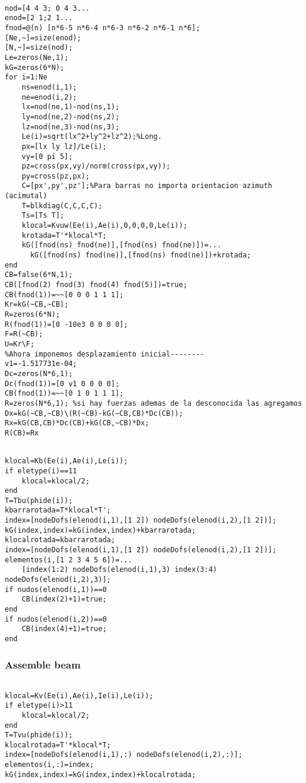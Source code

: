\begin{code}
\begin{verbatim}

nod=[4 4 3; 0 4 3...
enod=[2 1;2 1...
fnod=@(n) [n*6-5 n*6-4 n*6-3 n*6-2 n*6-1 n*6];
[Ne,~]=size(enod);
[N,~]=size(nod);
Le=zeros(Ne,1);
kG=zeros(6*N);
for i=1:Ne
    ns=enod(i,1);
    ne=enod(i,2);
    lx=nod(ne,1)-nod(ns,1);
    ly=nod(ne,2)-nod(ns,2);
    lz=nod(ne,3)-nod(ns,3);
    Le(i)=sqrt(lx^2+ly^2+lz^2);%Long.
    px=[lx ly lz]/Le(i);
    vy=[0 pi 5];
    pz=cross(px,vy)/norm(cross(px,vy));
    py=cross(pz,px);
    C=[px',py',pz'];%Para barras no importa orientacion azimuth (acimutal)
    T=blkdiag(C,C,C,C);
    Ts=[Ts T];
    klocal=Kvuw(Ee(i),Ae(i),0,0,0,0,Le(i));
    krotada=T'*klocal*T;
    kG([fnod(ns) fnod(ne)],[fnod(ns) fnod(ne)])=...
      kG([fnod(ns) fnod(ne)],[fnod(ns) fnod(ne)])+krotada;
end
CB=false(6*N,1);
CB([fnod(2) fnod(3) fnod(4) fnod(5)])=true;
CB(fnod(1))=~~[0 0 0 1 1 1];
Kr=kG(~CB,~CB);
R=zeros(6*N);
R(fnod(1))=[0 -10e3 0 0 0 0];
F=R(~CB);
U=Kr\F;
%Ahora imponemos desplazamiento inicial--------
v1=-1.517731e-04;
Dc=zeros(N*6,1);
Dc(fnod(1))=[0 v1 0 0 0 0];
CB(fnod(1))=~~[0 1 0 1 1 1];
R=zeros(N*6,1); %si hay fuerzas ademas de la desconocida las agregamos
Dx=kG(~CB,~CB)\(R(~CB)-kG(~CB,CB)*Dc(CB));
Rx=kG(CB,CB)*Dc(CB)+kG(CB,~CB)*Dx;
R(CB)=Rx
\end{verbatim}
\end{code}

\begin{code}
\begin{verbatim}

klocal=Kb(Ee(i),Ae(i),Le(i));
if eletype(i)==11
    klocal=klocal/2;
end
T=Tbu(phide(i));
kbarrarotada=T*klocal*T';
index=[nodeDofs(elenod(i,1),[1 2]) nodeDofs(elenod(i,2),[1 2])];
kG(index,index)=kG(index,index)+kbarrarotada;
klocalrotada=kbarrarotada;
index=[nodeDofs(elenod(i,1),[1 2]) nodeDofs(elenod(i,2),[1 2])];
elementos(i,[1 2 3 4 5 6])=...
    [index(1:2) nodeDofs(elenod(i,1),3) index(3:4) nodeDofs(elenod(i,2),3)];
if nudos(elenod(i,1))==0
    CB(index(2)+1)=true;
end
if nudos(elenod(i,2))==0
    CB(index(4)+1)=true;
end
\end{verbatim}
\end{code}
\subsubsection*{Assemble beam}
\begin{code}
\begin{verbatim}

klocal=Kv(Ee(i),Ae(i),Ie(i),Le(i));
if eletype(i)>11
    klocal=klocal/2;
end
T=Tvu(phide(i));
klocalrotada=T'*klocal*T;
index=[nodeDofs(elenod(i,1),:) nodeDofs(elenod(i,2),:)];
elementos(i,:)=index;
kG(index,index)=kG(index,index)+klocalrotada;
\end{verbatim}
\end{code}
\clearpage

